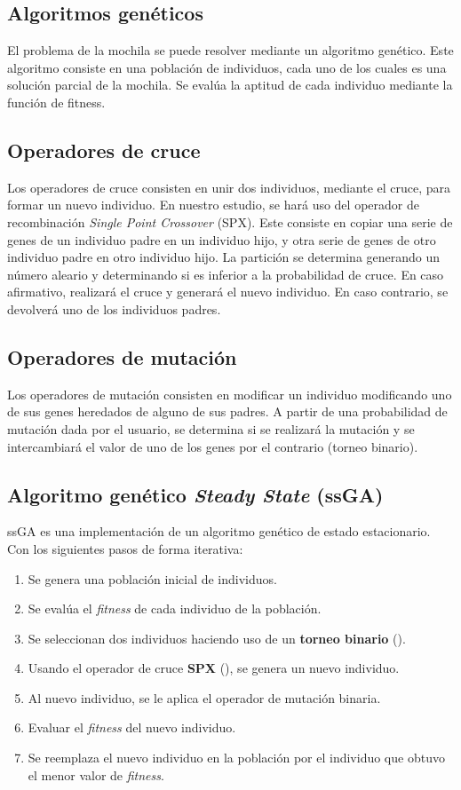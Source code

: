 \documentclass[runningheads]{llncs}
\begin{document}
\subsection{Algoritmos genéticos}
El problema de la mochila se puede resolver mediante un algoritmo genético.
Este algoritmo consiste en una población de individuos, cada uno de los cuales es una solución
parcial de la mochila. Se evalúa la aptitud de cada individuo mediante la función de fitness.

\subsection{Operadores de cruce}
Los operadores de cruce consisten en unir dos individuos, mediante el cruce, para formar un
nuevo individuo. En nuestro estudio, se hará uso del operador de recombinación \textit{Single Point Crossover} \cite{ref_spx} (SPX).
Este consiste en copiar una serie de genes de un individuo padre en un individuo hijo,
y otra serie de genes de otro individuo padre en otro individuo hijo.
La partición se determina generando un número aleario y determinando si es inferior a la probabilidad de cruce.
En caso afirmativo, realizará el cruce y generará el nuevo individuo. En caso contrario, se devolverá uno de los individuos padres.

\subsection{Operadores de mutación}
Los operadores de mutación consisten en modificar un individuo modificando uno de sus genes heredados de alguno de sus padres.
A partir de una probabilidad de mutación dada por el usuario, se determina si se realizará la mutación y se intercambiará el valor de uno de los genes
por el contrario (torneo binario).

\subsection{Algoritmo genético \textit{Steady State} (ssGA)}
ssGA es una implementación de un algoritmo genético de estado estacionario. Con los siguientes pasos de forma iterativa:

\begin{enumerate}
    \item Se genera una población inicial de individuos.
    \item Se evalúa el \textit{fitness} de cada individuo de la población.
    \item Se seleccionan dos individuos haciendo uso de un \textbf{torneo binario} (\cite{ref_tournament}).
    \item Usando el operador de cruce \textbf{SPX} (\cite{ref_spx}), se genera un nuevo individuo.
    \item Al nuevo individuo, se le aplica el operador de mutación binaria.
    \item Evaluar el \textit{fitness} del nuevo individuo.
    \item Se reemplaza el nuevo individuo en la población por el individuo que obtuvo el menor valor de \textit{fitness}.
\end{enumerate}
\end{document}
